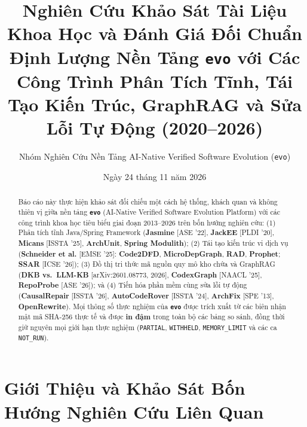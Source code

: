 \documentclass[10pt,a4paper]{article}
\title{\textbf{Nghiên Cứu Khảo Sát Tài Liệu Khoa Học và Đánh Giá Đối Chuẩn Định Lượng Nền Tảng \texttt{evo} với Các Công Trình Phân Tích Tĩnh, Tái Tạo Kiến Trúc, GraphRAG và Sửa Lỗi Tự Động (2020--2026)}}
\author{Nhóm Nghiên Cứu Nền Tảng AI-Native Verified Software Evolution (\texttt{evo})}
\date{Ngày 24 tháng 11 năm 2026}
\begin{document}
\maketitle

\begin{abstract}
Báo cáo này thực hiện khảo sát đối chiếu một cách hệ thống, khách quan và không thiên vị giữa nền tảng \textbf{\texttt{evo}} (AI-Native Verified Software Evolution Platform) với các công trình khoa học tiêu biểu giai đoạn 2013--2026 trên bốn hướng nghiên cứu: (1) Phân tích tĩnh Java/Spring Framework (\textbf{Jasmine} [ASE '22], \textbf{JackEE} [PLDI '20], \textbf{Micans} [ISSTA '25], \textbf{ArchUnit}, \textbf{Spring Modulith}); (2) Tái tạo kiến trúc vi dịch vụ (\textbf{Schneider et al.} [EMSE '25]: \textbf{Code2DFD}, \textbf{MicroDepGraph}, \textbf{RAD}, \textbf{Prophet}; \textbf{SSAR} [ICSE '26]); (3) Đồ thị tri thức mã nguồn quy mô kho chứa và GraphRAG (\textbf{DKB vs.\ LLM-KB} [arXiv:2601.08773, 2026], \textbf{CodexGraph} [NAACL '25], \textbf{RepoProbe} [ASE '26]); và (4) Tiến hóa phần mềm cùng sửa lỗi tự động (\textbf{CausalRepair} [ISSTA '26], \textbf{AutoCodeRover} [ISSTA '24], \textbf{ArchFix} [SPE '13], \textbf{OpenRewrite}). Mọi thông số thực nghiệm của \textbf{\texttt{evo}} được trích xuất từ các biên nhận mật mã SHA-256 thực tế và được \textbf{in đậm} trong toàn bộ các bảng so sánh, đồng thời giữ nguyên mọi giới hạn thực nghiệm (\texttt{PARTIAL}, \texttt{WITHHELD}, \texttt{MEMORY\_LIMIT} và các ca \texttt{NOT\_RUN}).
\end{abstract}

\section{Giới Thiệu và Khảo Sát Bốn Hướng Nghiên Cứu Liên Quan}
\end{document}

